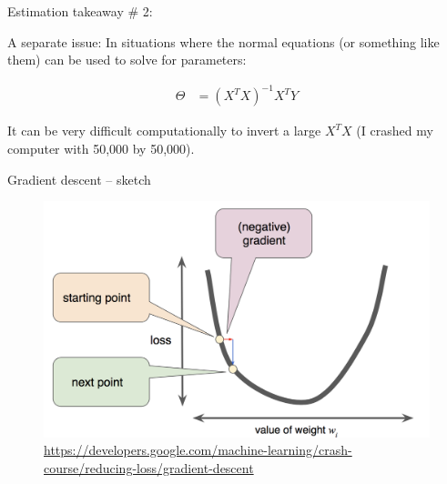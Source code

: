 \documentclass[aspectratio=169]{beamer}
\begin{document}
\begin{frame}{Estimation takeaway \# 2: }

A separate issue: In situations where the normal equations (or something like them) can be used to solve for parameters:

\begin{align*}
\Theta &=  
(X^TX)^{-1}X^TY
\end{align*}

It can be very difficult computationally to invert a large $X^TX$ (I crashed my computer with 50,000 by 50,000).  
\end{frame}



\begin{frame}{Gradient descent -- sketch}

\pause
\begin{figure}
\includegraphics[height=0.7\textheight]{grad_desc_google_4}
\caption*{\url{https://developers.google.com/machine-learning/crash-course/reducing-loss/gradient-descent}}
\end{figure}

\end{frame}
\end{document}
